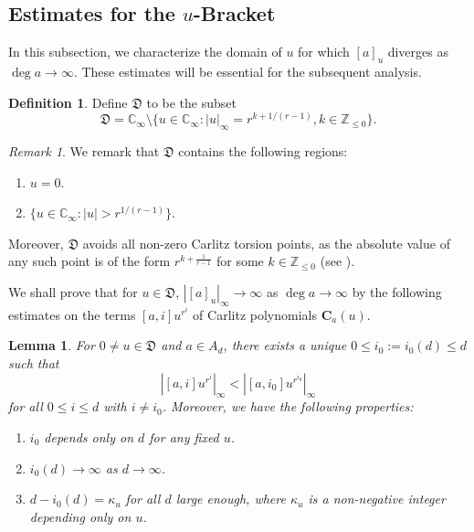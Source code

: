 \documentclass[12pt,reqno]{amsart}
\numberwithin{equation}{section}
\theoremstyle{plain}
\newtheorem{lem}[thm]{Lemma}
\theoremstyle{definition}
\newtheorem{df}[thm]{Definition}
\theoremstyle{remark}
\newtheorem{rmk}[thm]{Remark}
\newcommand{\ZZ}{\mathbb{Z}}
\newcommand{\CC}{\mathbb{C}}
\newcommand{\Dfk}{\mathfrak{D}}
\newcommand{\C}{\mathbf{C}}
\begin{document}
\subsection{Estimates for the \texorpdfstring{$u$}{u}-Bracket}\label{section:2.2}
In this subsection, we characterize the domain of $u$ for which $[a]_u$ diverges as $\deg a \to \infty$. These estimates will be essential for the subsequent analysis.
\begin{df}
    Define $\mathfrak{D}$ to be the subset 
    $$\Dfk=\CC_\infty\setminus\{u\in\CC_\infty:|u|_\infty=r^{k+1/(r-1)}, k\in\ZZ_{\leq 0}\}.$$
\end{df}
\begin{rmk}
    We remark that $\mathfrak{D}$ contains the following regions:
    \begin{enumerate}
        \item $u = 0$.
        \item $\{ u \in \CC_\infty : |u| > r^{1/(r-1)} \}$.
    \end{enumerate}
    Moreover, $\mathfrak{D}$ avoids all non-zero Carlitz torsion points, as the absolute value of any such point is of the form $r^{k + \frac{1}{r-1}}$ for some $k \in \ZZ_{\leq 0}$ (see \cite[Proposition 12.13]{Rosen2002}).
\end{rmk}

We shall prove that for $u \in \mathfrak{D}$, $|[a]_u|_\infty \to \infty$ as $\deg a \to \infty$ by the following estimates on the terms $[a,i]u^{r^i}$ of Carlitz polynomials $\C_a(u)$. 
\begin{lem}\label{lem-i_0(d)}
    For $0\neq u\in\mathfrak{D}$ and $a\in A_{d}$, there exists a unique $0\leq i_0:=i_0(d)\leq d$ such that 
    \[
        |[a,i]u^{r^i}|_\infty < |[a,i_0]u^{r^{i_0}}|_\infty
    \]
    for all $0\leq i\leq d$ with $i\neq i_0$. Moreover, we have the following properties:
    \begin{enumerate}
        \item $i_0$ depends only on $d$ for any fixed $u$.
        \item $i_0(d)\to\infty$ as $d\to\infty$.
        \item $d-i_0(d)=\kappa_u$  for all $d$ large enough, where $\kappa_u$ is a non-negative integer depending only on $u$.
    \end{enumerate}
\end{lem}
\end{document}

